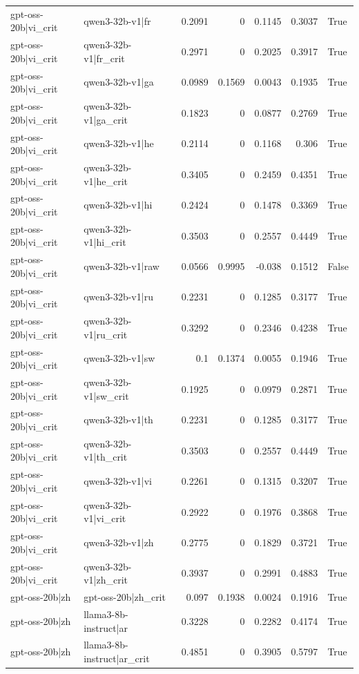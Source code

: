 \begin{table}
\begin{tabular}{l l r r r r l}
gpt-oss-20b|vi_crit & qwen3-32b-v1|fr & 0.2091 & 0 & 0.1145 & 0.3037 & True \\
gpt-oss-20b|vi_crit & qwen3-32b-v1|fr_crit & 0.2971 & 0 & 0.2025 & 0.3917 & True \\
gpt-oss-20b|vi_crit & qwen3-32b-v1|ga & 0.0989 & 0.1569 & 0.0043 & 0.1935 & True \\
gpt-oss-20b|vi_crit & qwen3-32b-v1|ga_crit & 0.1823 & 0 & 0.0877 & 0.2769 & True \\
gpt-oss-20b|vi_crit & qwen3-32b-v1|he & 0.2114 & 0 & 0.1168 & 0.306 & True \\
gpt-oss-20b|vi_crit & qwen3-32b-v1|he_crit & 0.3405 & 0 & 0.2459 & 0.4351 & True \\
gpt-oss-20b|vi_crit & qwen3-32b-v1|hi & 0.2424 & 0 & 0.1478 & 0.3369 & True \\
gpt-oss-20b|vi_crit & qwen3-32b-v1|hi_crit & 0.3503 & 0 & 0.2557 & 0.4449 & True \\
gpt-oss-20b|vi_crit & qwen3-32b-v1|raw & 0.0566 & 0.9995 & -0.038 & 0.1512 & False \\
gpt-oss-20b|vi_crit & qwen3-32b-v1|ru & 0.2231 & 0 & 0.1285 & 0.3177 & True \\
gpt-oss-20b|vi_crit & qwen3-32b-v1|ru_crit & 0.3292 & 0 & 0.2346 & 0.4238 & True \\
gpt-oss-20b|vi_crit & qwen3-32b-v1|sw & 0.1 & 0.1374 & 0.0055 & 0.1946 & True \\
gpt-oss-20b|vi_crit & qwen3-32b-v1|sw_crit & 0.1925 & 0 & 0.0979 & 0.2871 & True \\
gpt-oss-20b|vi_crit & qwen3-32b-v1|th & 0.2231 & 0 & 0.1285 & 0.3177 & True \\
gpt-oss-20b|vi_crit & qwen3-32b-v1|th_crit & 0.3503 & 0 & 0.2557 & 0.4449 & True \\
gpt-oss-20b|vi_crit & qwen3-32b-v1|vi & 0.2261 & 0 & 0.1315 & 0.3207 & True \\
gpt-oss-20b|vi_crit & qwen3-32b-v1|vi_crit & 0.2922 & 0 & 0.1976 & 0.3868 & True \\
gpt-oss-20b|vi_crit & qwen3-32b-v1|zh & 0.2775 & 0 & 0.1829 & 0.3721 & True \\
gpt-oss-20b|vi_crit & qwen3-32b-v1|zh_crit & 0.3937 & 0 & 0.2991 & 0.4883 & True \\
gpt-oss-20b|zh & gpt-oss-20b|zh_crit & 0.097 & 0.1938 & 0.0024 & 0.1916 & True \\
gpt-oss-20b|zh & llama3-8b-instruct|ar & 0.3228 & 0 & 0.2282 & 0.4174 & True \\
gpt-oss-20b|zh & llama3-8b-instruct|ar_crit & 0.4851 & 0 & 0.3905 & 0.5797 & True \\

\end{tabular}
\end{table}
